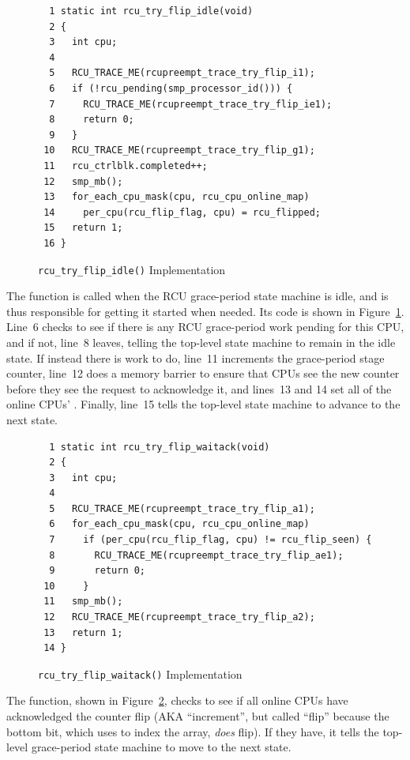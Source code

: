 \begin{figure}[tbp]
{ \scriptsize
\begin{verbatim}
  1 static int rcu_try_flip_idle(void)
  2 {
  3   int cpu;
  4
  5   RCU_TRACE_ME(rcupreempt_trace_try_flip_i1);
  6   if (!rcu_pending(smp_processor_id())) {
  7     RCU_TRACE_ME(rcupreempt_trace_try_flip_ie1);
  8     return 0;
  9   }
 10   RCU_TRACE_ME(rcupreempt_trace_try_flip_g1);
 11   rcu_ctrlblk.completed++;
 12   smp_mb();
 13   for_each_cpu_mask(cpu, rcu_cpu_online_map)
 14     per_cpu(rcu_flip_flag, cpu) = rcu_flipped;
 15   return 1;
 16 }
\end{verbatim}
}
\caption{{\tt rcu\_try\_flip\_idle()} Implementation}
\label{fig:app:rcuimpl:rcu_try_flip_idle() Implementation}
\end{figure}

The  function is called when the
RCU grace-period state machine is idle, and is thus responsible for
getting it started when needed.
Its code is shown in
Figure~\ref{fig:app:rcuimpl:rcu_try_flip_idle() Implementation}.
Line~6 checks to see if there is any RCU grace-period work
pending for this CPU, and if not, line~8 leaves, telling
the top-level state machine to remain in the idle state.
If instead there is work to do, line~11 increments the
grace-period stage counter, line~12 does a memory barrier
to ensure that CPUs see the new counter before they see the
request to acknowledge it, and lines~13 and 14 set all of
the online CPUs' .
Finally, line~15 tells the top-level state machine to
advance to the next state.

\begin{figure}[tbp]
{ \scriptsize
\begin{verbatim}
  1 static int rcu_try_flip_waitack(void)
  2 {
  3   int cpu;
  4
  5   RCU_TRACE_ME(rcupreempt_trace_try_flip_a1);
  6   for_each_cpu_mask(cpu, rcu_cpu_online_map)
  7     if (per_cpu(rcu_flip_flag, cpu) != rcu_flip_seen) {
  8       RCU_TRACE_ME(rcupreempt_trace_try_flip_ae1);
  9       return 0;
 10     }
 11   smp_mb();
 12   RCU_TRACE_ME(rcupreempt_trace_try_flip_a2);
 13   return 1;
 14 }
\end{verbatim}
}
\caption{{\tt rcu\_try\_flip\_waitack()} Implementation}
\label{fig:app:rcuimpl:rcu_try_flip_waitack() Implementation}
\end{figure}

The  function, shown in
Figure~\ref{fig:app:rcuimpl:rcu_try_flip_waitack() Implementation},
checks to see
if all online CPUs have acknowledged the counter flip (AKA ``increment'',
but called ``flip'' because the bottom bit, which 
uses to index the  array, \emph{does} flip).
If they have, it tells the top-level grace-period state machine to
move to the next state.

